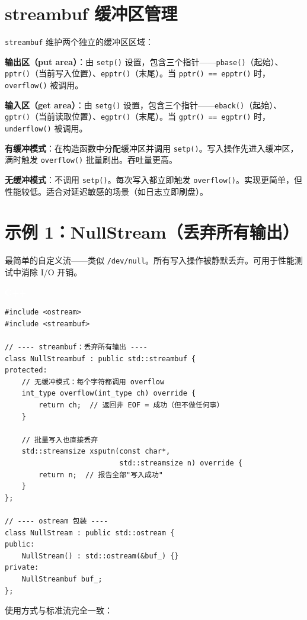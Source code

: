 \documentclass[12pt,a4paper,fontset=fandol]{ctexbook}
\newcommand{\Tp}[1]{\texttt{#1}}
\newcommand{\cpplabel}{%
  \noindent\begin{tcolorbox}[sharp corners,colback=algheadbg,colframe=algheadbg,
    left=6pt,right=6pt,top=2pt,bottom=2pt,boxrule=0pt]
  \textcolor{white}{\small\bfseries\sffamily C++}\end{tcolorbox}%
}
\begin{document}
\section{streambuf 缓冲区管理}

\Tp{streambuf} 维护两个独立的缓冲区区域：

\textbf{输出区（put area）}：由 \Tp{setp()} 设置，包含三个指针——\Tp{pbase()}（起始）、\Tp{pptr()}（当前写入位置）、\Tp{epptr()}（末尾）。当 \Tp{pptr() == epptr()} 时，\Tp{overflow()} 被调用。

\textbf{输入区（get area）}：由 \Tp{setg()} 设置，包含三个指针——\Tp{eback()}（起始）、\Tp{gptr()}（当前读取位置）、\Tp{egptr()}（末尾）。当 \Tp{gptr() == egptr()} 时，\Tp{underflow()} 被调用。

\begin{note}[title=有缓冲 vs 无缓冲]
\textbf{有缓冲模式}：在构造函数中分配缓冲区并调用 \Tp{setp()}。写入操作先进入缓冲区，满时触发 \Tp{overflow()} 批量刷出。吞吐量更高。

\textbf{无缓冲模式}：不调用 \Tp{setp()}。每次写入都立即触发 \Tp{overflow()}。实现更简单，但性能较低。适合对延迟敏感的场景（如日志立即刷盘）。
\end{note}

\section{示例 1：NullStream（丢弃所有输出）}

最简单的自定义流——类似 \texttt{/dev/null}。所有写入操作被静默丢弃。可用于性能测试中消除 I/O 开销。

\cpplabel
\begin{lstlisting}
#include <ostream>
#include <streambuf>

// ---- streambuf：丢弃所有输出 ----
class NullStreambuf : public std::streambuf {
protected:
    // 无缓冲模式：每个字符都调用 overflow
    int_type overflow(int_type ch) override {
        return ch;  // 返回非 EOF = 成功（但不做任何事）
    }

    // 批量写入也直接丢弃
    std::streamsize xsputn(const char*,
                           std::streamsize n) override {
        return n;  // 报告全部"写入成功"
    }
};

// ---- ostream 包装 ----
class NullStream : public std::ostream {
public:
    NullStream() : std::ostream(&buf_) {}
private:
    NullStreambuf buf_;
};
\end{lstlisting}

使用方式与标准流完全一致：
\end{document}
